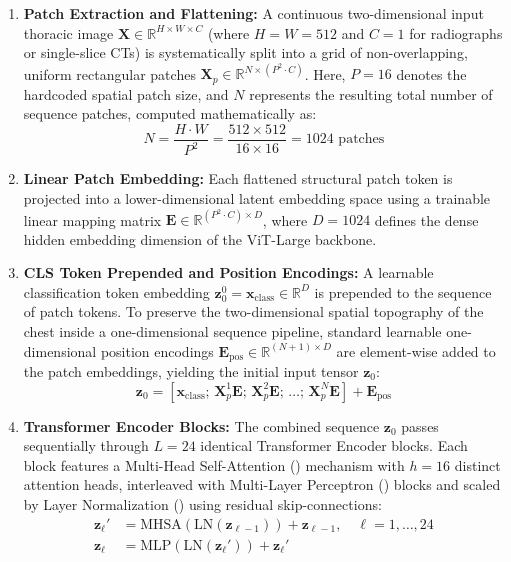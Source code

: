 \begin{enumerate}
	\item \textbf{Patch Extraction and Flattening:} A continuous two-dimensional input thoracic image $\mathbf{X} \in \mathbb{R}^{H \times W \times C}$ (where $H=W=512$ and $C=1$ for radiographs or single-slice CTs) is systematically split into a grid of non-overlapping, uniform rectangular patches $\mathbf{X}_p \in \mathbb{R}^{N \times (P^2 \cdot C)}$. Here, $P = 16$ denotes the hardcoded spatial patch size, and $N$ represents the resulting total number of sequence patches, computed mathematically as:
	\begin{equation}
		N = \frac{H \cdot W}{P^2} = \frac{512 \times 512}{16 \times 16} = 1024 \text{ patches}
	\end{equation}
	
	\item \textbf{Linear Patch Embedding:} Each flattened structural patch token is projected into a lower-dimensional latent embedding space using a trainable linear mapping matrix $\mathbf{E} \in \mathbb{R}^{(P^2 \cdot C) \times D}$, where $D = 1024$ defines the dense hidden embedding dimension of the ViT-Large backbone.
	
	\item \textbf{CLS Token Prepended and Position Encodings:} A learnable classification token embedding $\mathbf{z}_0^0 = \mathbf{x}_{\text{class}} \in \mathbb{R}^D$ is prepended to the sequence of patch tokens. To preserve the two-dimensional spatial topography of the chest inside a one-dimensional sequence pipeline, standard learnable one-dimensional position encodings $\mathbf{E}_{\text{pos}} \in \mathbb{R}^{(N+1) \times D}$ are element-wise added to the patch embeddings, yielding the initial input tensor $\mathbf{z}_0$:
	\begin{equation}
		\mathbf{z}_0 = \left[ \mathbf{x}_{\text{class}}; \, \mathbf{X}_p^1\mathbf{E}; \, \mathbf{X}_p^2\mathbf{E}; \, \dots; \, \mathbf{X}_p^N\mathbf{E} \right] + \mathbf{E}_{\text{pos}}
	\end{equation}
	
	\item \textbf{Transformer Encoder Blocks:} The combined sequence $\mathbf{z}_0$ passes sequentially through $L = 24$ identical Transformer Encoder blocks. Each block features a Multi-Head Self-Attention () mechanism with $h = 16$ distinct attention heads, interleaved with Multi-Layer Perceptron () blocks and scaled by Layer Normalization () using residual skip-connections:
	\begin{align}
		\mathbf{z}_{\ell}' &= \text{MHSA}(\text{LN}(\mathbf{z}_{\ell-1})) + \mathbf{z}_{\ell-1}, \quad \ell = 1, \dots, 24 \\
		\mathbf{z}_{\ell} &= \text{MLP}(\text{LN}(\mathbf{z}_{\ell}')) + \mathbf{z}_{\ell}'
	\end{align}
\end{enumerate}


